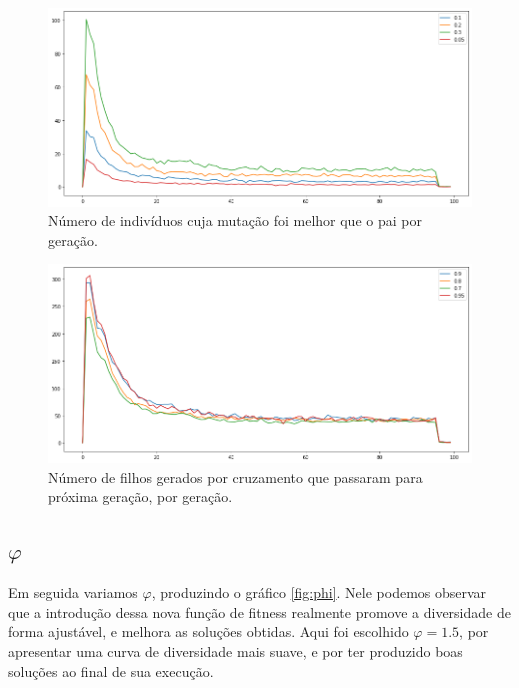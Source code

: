 \documentclass[10pt,twocolumn,letterpaper]{article}
\begin{document}
\begin{figure}[H]
   \begin{center}
   \includegraphics[width=\linewidth]{mut_better.png}
   \end{center}
      \caption{Número de indivíduos cuja mutação foi melhor que o pai por geração.}
      \label{fig:mutbetter}
\end{figure}

\begin{figure}[H]
   \begin{center}
   \includegraphics[width=\linewidth]{better_child.png}
   \end{center}
      \caption{Número de filhos gerados por cruzamento que passaram para próxima geração, por geração.}
      \label{fig:childbetter}
\end{figure}

\subsection{$\varphi$}

Em seguida variamos $\varphi$, produzindo o gráfico \ref{fig:phi}. Nele podemos observar que a introdução dessa nova função de fitness realmente promove a diversidade de forma ajustável, e melhora as soluções obtidas. Aqui foi escolhido $\varphi = 1.5$, por apresentar uma curva de diversidade mais suave, e por ter produzido boas soluções ao final de sua execução.
\end{document}
